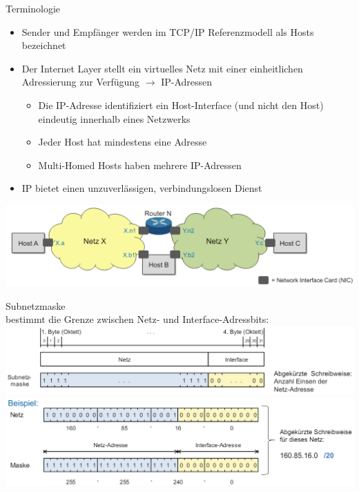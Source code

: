 \begin{definition}{Terminologie}
    \begin{itemize}
        \item Sender und Empfänger werden im TCP/IP Referenzmodell als Hosts bezeichnet
        \item Der Internet Layer stellt ein virtuelles Netz mit einer einheitlichen Adressierung zur Verfügung $\rightarrow$ IP-Adressen
        \begin{itemize}
            \item Die IP-Adresse identifiziert ein Host-Interface (und nicht den Host) eindeutig innerhalb eines Netzwerks
            \item Jeder Host hat mindestens eine Adresse
            \item Multi-Homed Hosts haben mehrere IP-Adressen
        \end{itemize}
        \item IP bietet einen unzuverlässigen, verbindungslosen Dienst
    \end{itemize}
    \includegraphics[width=1\linewidth]{images/ip_adressen_terminologie.png}
\end{definition}

\begin{concept}{Subnetzmaske}\\
    bestimmt die Grenze zwischen Netz- und Interface-Adressbits:\\
        \includegraphics[width=1\linewidth]{images/subnetzmaske.png}\\
    \includegraphics[width=1\linewidth]{images/subnetzmaske_bsp.png}   
\end{concept}

